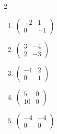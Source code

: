 \begin{multicols}{2}
\begin{enumerate}[label=\arabic*., leftmargin=*]
\item $\begin{pmatrix}-2 & 1\\ 0 & -1\end{pmatrix}$
\item $\begin{pmatrix}3 & -4\\ 2 & -3\end{pmatrix}$
\item $\begin{pmatrix}-1 & 2\\ 0 & 1\end{pmatrix}$
\item $\begin{pmatrix}5 & 0\\ 10 & 0\end{pmatrix}$
\item $\begin{pmatrix}-4 & -4\\ 0 & 0\end{pmatrix}$
\end{enumerate}
\end{multicols}


